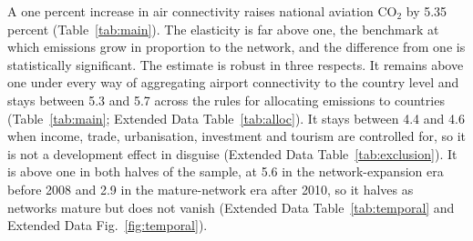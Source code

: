 \documentclass[12pt]{extarticle}
\begin{document}
A one percent increase in air connectivity raises national aviation CO$_2$
by 5.35 percent (Table~\ref{tab:main}). The elasticity is far above one,
the benchmark at which emissions grow in proportion to the network, and
the difference from one is statistically significant. The estimate is
robust in three respects. It remains above one under every way of
aggregating airport connectivity to the country level and stays between
5.3 and 5.7 across the rules for allocating emissions to countries
(Table~\ref{tab:main}; Extended Data Table~\ref{tab:alloc}). It stays
between 4.4 and 4.6 when income, trade, urbanisation, investment and
tourism are controlled for, so it is not a development effect in disguise
(Extended Data Table~\ref{tab:exclusion}). It is above one in both halves
of the sample, at 5.6 in the network-expansion era before 2008 and 2.9 in
the mature-network era after 2010, so it halves as networks mature but
does not vanish (Extended Data Table~\ref{tab:temporal} and Extended Data
Fig.~\ref{fig:temporal}).
\end{document}
